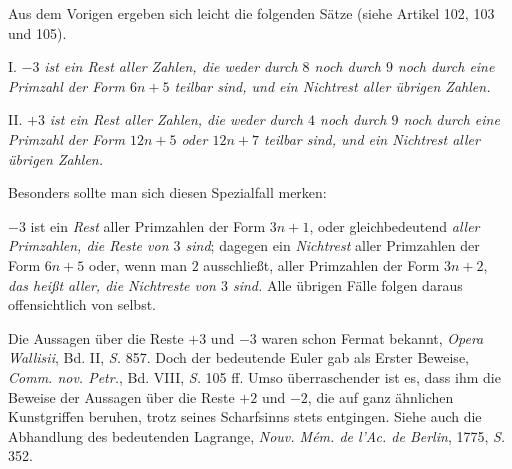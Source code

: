 Aus dem Vorigen ergeben sich leicht die folgenden Sätze (siehe Artikel 102, 103 und 105).

I. $-3$ \emph{ist ein Rest aller Zahlen, die weder durch $8$ noch durch $9$ noch durch eine Primzahl der Form $6n+5$ teilbar sind, und ein Nichtrest aller übrigen Zahlen.}

II. $+3$ \emph{ist ein Rest aller Zahlen, die weder durch $4$ noch durch $9$ noch durch eine Primzahl der Form $12n+5$ oder $12n+7$ teilbar sind, und ein Nichtrest aller übrigen Zahlen.}

Besonders sollte man sich diesen Spezialfall merken:

$-3$ ist ein \emph{Rest} aller Primzahlen der Form $3n+1$, oder gleichbedeutend \emph{aller Primzahlen, die Reste von $3$ sind}; dagegen ein \emph{Nichtrest} aller Primzahlen der Form $6n+5$ oder, wenn man $2$ ausschließt, aller Primzahlen der Form $3n+2$, \emph{das heißt aller, die Nichtreste von $3$ sind.} Alle übrigen Fälle folgen daraus offensichtlich von selbst.

Die Aussagen über die Reste $+3$ und $-3$ waren schon Fermat bekannt, \emph{Opera Wallisii}, Bd. II, \emph{S.} 857. Doch der bedeutende Euler gab als Erster Beweise, \emph{Comm. nov. Petr.}, Bd. VIII, \emph{S.} 105 ff. Umso überraschender ist es, dass ihm die Beweise der Aussagen über die Reste $+2$ und $-2$, die auf ganz ähnlichen Kunstgriffen beruhen, trotz seines Scharfsinns stets entgingen. Siehe auch die Abhandlung des bedeutenden Lagrange, \emph{Nouv. M\'em. de l'Ac. de Berlin}, 1775, \emph{S.} 352.
